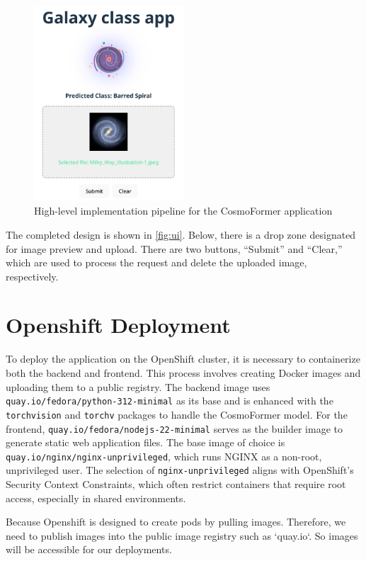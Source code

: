 \begin{figure}[htbp]
  \centering
  \includegraphics[width=0.5\textwidth]{obrazky-figures/05-implementation/ui.png}
  \caption{High-level implementation pipeline for the CosmoFormer application}
  \label{fig:ui}
\end{figure}

The completed design is shown in \autoref{fig:ui}. Below, there is a drop zone designated for image preview and upload. There are two buttons, “Submit” and “Clear,” which are used to process the request and delete the uploaded image, respectively.

\section{Openshift Deployment}

To deploy the application on the OpenShift cluster, it is necessary to containerize both the backend and frontend. This process involves creating Docker images and uploading them to a public registry. The backend image uses \texttt{quay.io/fedora/python-312-minimal} as its base and is enhanced with the \texttt{torchvision} and \texttt{torchv} packages to handle the CosmoFormer model. For the frontend, \texttt{quay.io/fedora/nodejs-22-minimal} serves as the builder image to generate static web application files. The base image of choice is \texttt{quay.io/nginx/nginx-unprivileged}, which runs NGINX as a non-root, unprivileged user. The selection of \texttt{nginx-unprivileged} aligns with OpenShift’s Security Context Constraints, which often restrict containers that require root access, especially in shared environments.

Because Openshift is designed to create pods by pulling images. Therefore, we need to publish images into the public image registry such as `quay.io`. So images will be accessible for our deployments.

